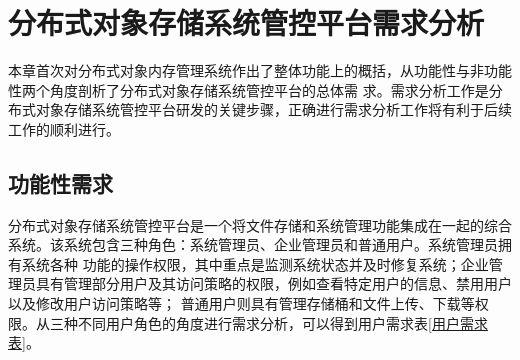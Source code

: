 \chapter{分布式对象存储系统管控平台需求分析}

本章首次对分布式对象内存管理系统作出了整体功能上的概括，从功能性与非功能性两个角度剖析了分布式对象存储系统管控平台的总体需
求。需求分析工作是分布式对象存储系统管控平台研发的关键步骤，正确进行需求分析工作将有利于后续工作的顺利进行。

\section{功能性需求}

分布式对象存储系统管控平台是一个将文件存储和系统管理功能集成在一起的综合系统。该系统包含三种角色：系统管理员、企业管理员和普通用户。系统管理员拥有系统各种
功能的操作权限，其中重点是监测系统状态并及时修复系统；企业管理员具有管理部分用户及其访问策略的权限，例如查看特定用户的信息、禁用用户以及修改用户访问策略等；
普通用户则具有管理存储桶和文件上传、下载等权限。从三种不同用户角色的角度进行需求分析，可以得到用户需求表\ref{用户需求表}。





